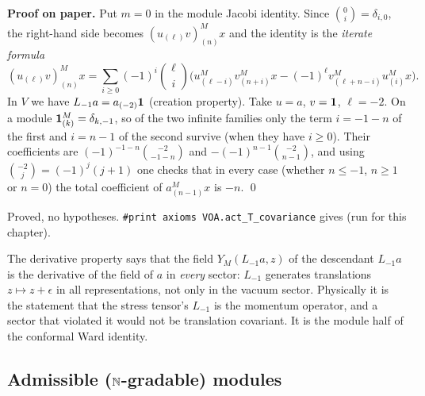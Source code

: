 \textbf{Proof on paper.} Put $m=0$ in the module Jacobi identity. Since $\binom0i = \delta_{i,0}$, the
right-hand side becomes $(u_{(\ell)}v)^M_{(n)}x$ and the identity is the \emph{iterate formula}
\begin{equation*}
 (u_{(\ell)}v)^M_{(n)}x = \sum_{i\ge0}(-1)^i\binom\ell i\Big(u^M_{(\ell-i)}v^M_{(n+i)}x - (-1)^\ell v^M_{(\ell+n-i)}u^M_{(i)}x\Big).
\end{equation*}
In $V$ we have $L_{-1}a = a_{(-2)}\mathbf{1}$ (creation property). Take $u = a$, $v=\mathbf{1}$,
$\ell = -2$. On a module $\mathbf{1}^M_{(k)} = \delta_{k,-1}$, so of the two infinite families only the
term $i = -1-n$ of the first and $i = n-1$ of the second survive (when they have $i\ge0$). Their
coefficients are $(-1)^{-1-n}\binom{-2}{-1-n}$ and $-(-1)^{n-1}\binom{-2}{n-1}$, and using
$\binom{-2}{j} = (-1)^j(j+1)$ one checks that in every case (whether $n\le-1$, $n\ge1$ or $n=0$) the total
coefficient of $a^M_{(n-1)}x$ is $-n$. \qed

\begin{status}
Proved, no hypotheses. \texttt{\#print axioms VOA.act\_T\_covariance} gives
 (run for this chapter).
\end{status}

\begin{physics}
The derivative property says that the field $Y_M(L_{-1}a,z)$ of the descendant $L_{-1}a$ is the derivative of the
field of $a$ in \emph{every} sector: $L_{-1}$ generates translations $z\mapsto z+\epsilon$ in all
representations, not only in the vacuum sector. Physically it is the statement that the stress tensor's
$L_{-1}$ is the momentum operator, and a sector that violated it would not be translation covariant. It is
the module half of the conformal Ward identity.
\end{physics}

\subsection{Admissible (\texorpdfstring{${\mathbb{N}}$}{N}-gradable) modules}

